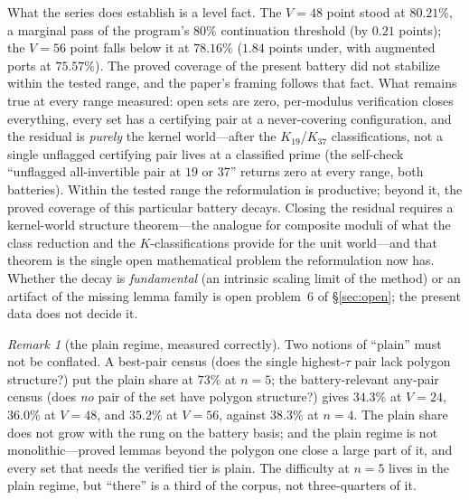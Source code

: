 \documentclass[11pt,a4paper]{article}
\numberwithin{equation}{section}
\theoremstyle{plain}
\theoremstyle{definition}
\theoremstyle{remark}
\newtheorem{remark}[theorem]{Remark}
\begin{document}
What the series does establish is a level fact. The $V=48$ point stood
at $80.21\%$, a marginal pass of the program's $80\%$ continuation
threshold (by $0.21$ points); the $V=56$ point falls below it at
$78.16\%$ ($1.84$ points under, with augmented ports at $75.57\%$). The
proved coverage of the present battery did not stabilize within the
tested range, and the paper's framing follows that fact. What remains
true at every range measured: open sets are zero, per-modulus
verification closes everything, every set has a certifying pair at a
never-covering configuration, and the residual is \emph{purely} the
kernel world---after the $K_{19}$/$K_{37}$ classifications, not a single
unflagged certifying pair lives at a classified prime (the self-check
``unflagged all-invertible pair at $19$ or $37$'' returns zero at every
range, both batteries). Within the tested range the reformulation is
productive; beyond it, the proved coverage of this particular battery
decays. Closing the residual requires a kernel-world structure
theorem---the analogue for composite moduli of what the class reduction
and the $K$-classifications provide for the unit world---and that theorem
is the single open mathematical problem the reformulation now has.
Whether the decay is \emph{fundamental} (an intrinsic scaling limit of
the method) or an artifact of the missing lemma family is open
problem~6 of \S\ref{sec:open}; the present
data does not decide it.

\begin{remark}[the plain regime, measured correctly]\label{rem:plain}
Two notions of ``plain'' must not be conflated. A best-pair census (does
the single highest-$\tau$ pair lack polygon structure?) put the plain
share at $73\%$ at $n=5$; the battery-relevant any-pair census (does
\emph{no} pair of the set have polygon structure?) gives
$34.3\%$ at $V=24$, $36.0\%$ at $V=48$, and $35.2\%$ at $V=56$, against
$38.3\%$ at $n=4$.
The plain share does not grow with the rung on the battery basis; and
the plain regime is not monolithic---proved lemmas beyond the polygon one
close a large part of it, and every set that needs the verified tier is
plain. The difficulty at $n=5$ lives in the plain regime, but ``there''
is a third of the corpus, not three-quarters of it.
\end{remark}

\end{document}
